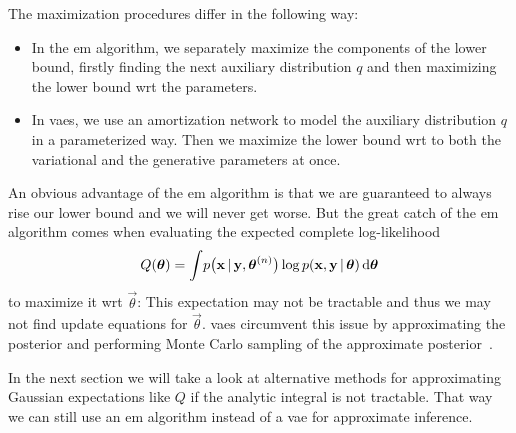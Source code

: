 		The maximization procedures differ in the following way:
		\begin{itemize}
			\item In the \ac{em} algorithm, we separately maximize the components of the lower bound, firstly finding the next auxiliary distribution \(q\) and then maximizing the lower bound \ac{wrt} the parameters.
			\item In \acp{vae}, we use an amortization network to model the auxiliary distribution \(q\) in a parameterized way. Then we maximize the lower bound \ac{wrt} to both the variational and the generative parameters at once.
		\end{itemize}
		An obvious advantage of the \ac{em} algorithm is that we are guaranteed to always rise our lower bound and we will never get worse. But the great catch of the \ac{em} algorithm comes when evaluating the expected complete log-likelihood
		\begin{align*}
			Q(\boldsymbol{\mathrm{\theta}}) = \int\! p\big(\boldsymbol{\mathrm{x}} \,\vert\, \boldsymbol{\mathrm{y}}, \boldsymbol{\mathrm{\theta}}^{(n)}\big) \log p(\boldsymbol{\mathrm{x}}, \boldsymbol{\mathrm{y}} \,\vert\, \boldsymbol{\mathrm{\theta}}) \dd{\boldsymbol{\mathrm{\theta}}}
		\end{align*}
		to maximize it \ac{wrt} \(\vec{\theta}\): This expectation may not be tractable and thus we may not find update equations for \(\vec{\theta}\). \acp{vae} circumvent this issue by approximating the posterior and performing Monte Carlo sampling of the approximate posterior~\cite{kingmaAutoEncodingVariationalBayes2014}.


		In the next section we will take a look at alternative methods for approximating Gaussian expectations like \(Q\) if the analytic integral is not tractable. That way we can still use an \ac{em} algorithm instead of a \ac{vae} for approximate inference.
